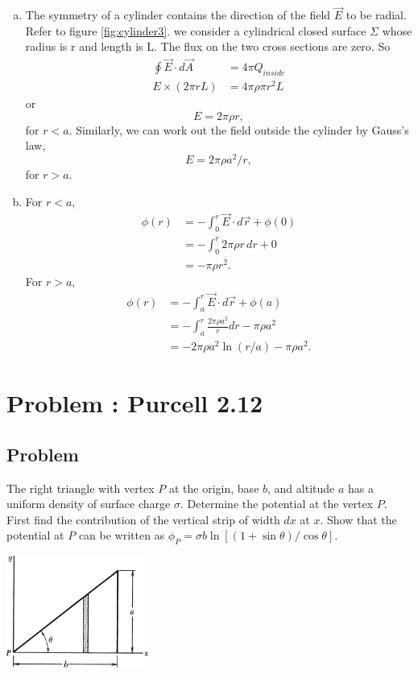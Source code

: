 \documentclass[solutions]{esg8022pset}
\begin{document}
  \begin{enumerate}[(a)]
    \item The symmetry of a cylinder contains the direction of the field
      $\vec{E}$ to be radial.  Refer to figure \ref{fig:cylinder3}.  we
      consider a cylindrical closed surface $\Sigma$ whose radius is r and
      length is L.  The flux on the two cross sections are zero.  So
      \begin{align*}
        \oint \vec{E}\cdot d\vec{A} & = 4\pi Q_{inside}\\
        E\times(2\pi rL) & = 4\pi\rho\pi r^2L
      \end{align*}
      or
      \begin{equation*}
      E=2\pi\rho r,
      \end{equation*}
      for $r<a$.  Similarly, we can work out the field outside the cylinder
      by Gauss's law,
      \begin{equation*}
      E=2\pi\rho a^2/r,
      \end{equation*}
      for $r>a$.
    \item For $r<a$,
      \begin{align*}
        \phi(r) & = -\int_0^r\vec{E}\cdot d\vec{r}+\phi(0)\\
                & = -\int_0^r 2\pi\rho r\,dr+0\\
                & = -\pi\rho r^2.
      \end{align*}
      For $r>a$,
      \begin{align*}
        \phi(r) & = -\int_a^r \vec{E}\cdot d\vec{r}+\phi(a)\\
                & = -\int_a^r\frac{2\pi\rho a^2}{r}dr-\pi\rho a^2\\
                & = -2\pi\rho a^2\ln{(r/a)}-\pi\rho a^2.
      \end{align*}
  \end{enumerate}
\section{Problem \thesection: Purcell 2.12}
\subsection{Problem}
  The right triangle with vertex $P$ at the origin, base $b$, and altitude $a$ has a uniform density of surface charge $\sigma$. Determine the potential at the vertex $P$. First find the contribution of the vertical strip of width $dx$ at $x$. Show that the potential at $P$ can be written as $\phi_P = \sigma b \ln[(1 + \sin \theta) / \cos \theta]$.
  \begin{center}\includegraphics[width=0.35\textwidth]{ps02_3}\end{center}
\end{document}
